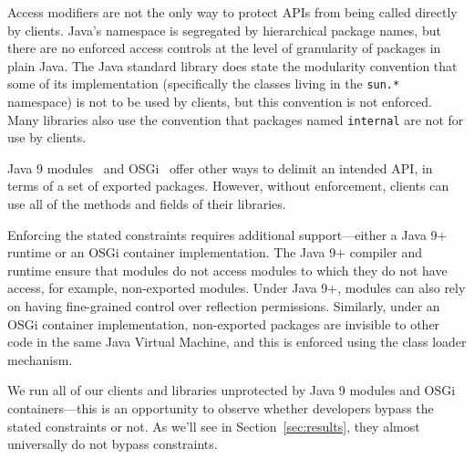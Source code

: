 
Access modifiers are not the only way to protect APIs from being
called directly by clients.  Java's namespace is segregated by
hierarchical package names, but there are no enforced access controls at the level of granularity of packages in plain Java. 
The Java standard library does state the modularity convention
that some of its implementation (specifically the classes living in
the \texttt{sun.*} namespace) is not to be used by clients, but this
convention is not enforced. Many libraries also use the convention that packages
named \texttt{internal} are not for use by clients. 

Java 
9 modules~\cite{corporation17:_java_platf_modul_system_jsr} and OSGi~\cite{alliance20:_osgi_core_releas_specif} offer other ways to delimit an intended API, in terms of a set of exported
packages. However, without enforcement, clients can use
all of the methods and fields of their libraries.

Enforcing the stated constraints requires additional support---either
a Java 9+ runtime or an OSGi container implementation. The Java 9+
compiler and runtime ensure that modules do not access modules to
which they do not have access, for example, non-exported modules. Under Java
9+, modules can also rely on having fine-grained control over
reflection permissions. Similarly, under an OSGi container implementation,
non-exported packages are invisible to other code in the same Java
Virtual Machine, and this is enforced using the class loader
mechanism. 

We run all of our clients and libraries unprotected by Java 9 modules
and OSGi containers---this is an opportunity to observe whether developers
bypass the stated constraints or not. As we'll see in Section~\ref{sec:results}, 
they almost universally do not bypass constraints.





